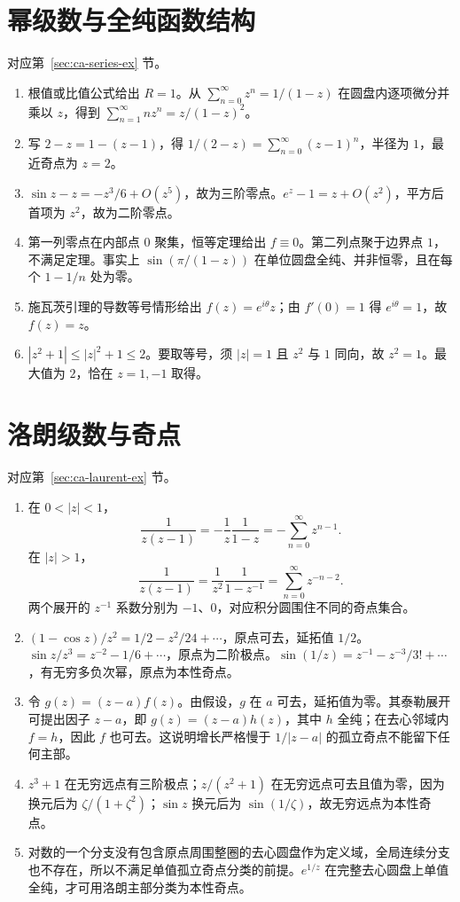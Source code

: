 \section{幂级数与全纯函数结构}
对应第~\ref{sec:ca-series-ex} 节。
\begin{enumerate}
 \item 根值或比值公式给出 $R=1$。从 $\sum_{n=0}^\infty z^n=1/(1-z)$ 在圆盘内逐项微分并乘以 $z$，得到 $\sum_{n=1}^\infty nz^n=z/(1-z)^2$。
 \item 写 $2-z=1-(z-1)$，得 $1/(2-z)=\sum_{n=0}^\infty(z-1)^n$，半径为 $1$，最近奇点为 $z=2$。
 \item $\sin z-z=-z^3/6+O(z^5)$，故为三阶零点。$e^z-1=z+O(z^2)$，平方后首项为 $z^2$，故为二阶零点。
 \item 第一列零点在内部点 $0$ 聚集，恒等定理给出 $f\equiv0$。第二列点聚于边界点 $1$，不满足定理。事实上 $\sin(\pi/(1-z))$ 在单位圆盘全纯、并非恒零，且在每个 $1-1/n$ 处为零。
 \item 施瓦茨引理的导数等号情形给出 $f(z)=e^{i\theta}z$；由 $f'(0)=1$ 得 $e^{i\theta}=1$，故 $f(z)=z$。
 \item $|z^2+1|\le|z|^2+1\le2$。要取等号，须 $|z|=1$ 且 $z^2$ 与 $1$ 同向，故 $z^2=1$。最大值为 $2$，恰在 $z=1,-1$ 取得。
\end{enumerate}

\section{洛朗级数与奇点}
对应第~\ref{sec:ca-laurent-ex} 节。
\begin{enumerate}
 \item 在 $0<|z|<1$，
 \[
 \frac1{z(z-1)}=-\frac1z\frac1{1-z}=-\sum_{n=0}^\infty z^{n-1}.
 \]
 在 $|z|>1$，
 \[
 \frac1{z(z-1)}=\frac1{z^2}\frac1{1-z^{-1}}
 =\sum_{n=0}^\infty z^{-n-2}.
 \]
 两个展开的 $z^{-1}$ 系数分别为 $-1$、$0$，对应积分圆围住不同的奇点集合。
 \item $(1-\cos z)/z^2=1/2-z^2/24+\cdots$，原点可去，延拓值 $1/2$。$\sin z/z^3=z^{-2}-1/6+\cdots$，原点为二阶极点。$\sin(1/z)=z^{-1}-z^{-3}/3!+\cdots$，有无穷多负次幂，原点为本性奇点。
 \item 令 $g(z)=(z-a)f(z)$。由假设，$g$ 在 $a$ 可去，延拓值为零。其泰勒展开可提出因子 $z-a$，即 $g(z)=(z-a)h(z)$，其中 $h$ 全纯；在去心邻域内 $f=h$，因此 $f$ 也可去。这说明增长严格慢于 $1/|z-a|$ 的孤立奇点不能留下任何主部。
 \item $z^3+1$ 在无穷远点有三阶极点；$z/(z^2+1)$ 在无穷远点可去且值为零，因为换元后为 $\zeta/(1+\zeta^2)$；$\sin z$ 换元后为 $\sin(1/\zeta)$，故无穷远点为本性奇点。
 \item 对数的一个分支没有包含原点周围整圈的去心圆盘作为定义域，全局连续分支也不存在，所以不满足单值孤立奇点分类的前提。$e^{1/z}$ 在完整去心圆盘上单值全纯，才可用洛朗主部分类为本性奇点。
\end{enumerate}

